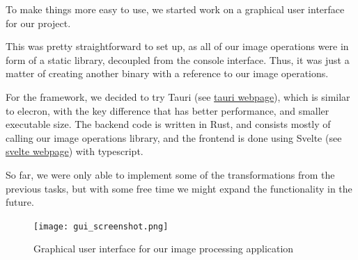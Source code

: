 \documentclass[12pt]{article}
\begin{document}
To make things more easy to use, we started work on a graphical user interface for our project.

This was pretty straightforward to set up, as all of our image operations were in form of a static library, 
decoupled from the console interface. 
Thus, it was just a matter of creating another binary with a reference to our image operations.

For the framework, we decided to try Tauri (see \href{https://tauri.app/about/intro}{tauri webpage}), which is similar to elecron, with the key difference that has better performance, and smaller executable size.
The backend code is written in Rust, and consists mostly of calling our image operations library,
and the frontend is done using Svelte (see \href{https://svelte.dev}{svelte webpage}) with typescript.

So far, we were only able to implement some of the transformations from the previous tasks,
but with some free time we might expand the functionality in the future.

\begin{figure}[H]\centering
    \texttt{[image: gui\_screenshot.png]}
    \caption{Graphical user interface for our image processing application}
\end{figure}
\end{document}
